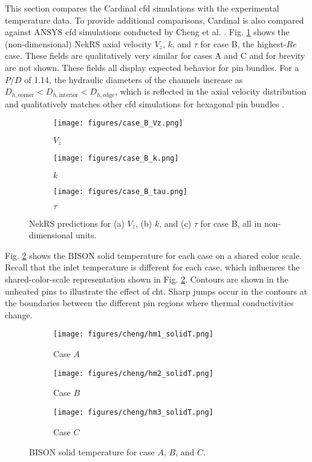 \documentclass[3p,,preprint,11pt]{elsarticle}
\begin{document}
This section compares the Cardinal \gls{cfd} simulations with the experimental temperature data. To provide additional comparisons, Cardinal is also compared against ANSYS \gls{cfd} simulations conducted by Cheng et al. \cite{cheng2009}. Fig. \ref{fig:velocity} shows the (non-dimensional) NekRS axial velocity $V_z$, $k$, and $\tau$ for case B, the highest-$Re$ case. These fields are qualitatively very similar for cases A and C and for brevity are not shown. These fields all display expected behavior for pin bundles. For a $P/D$ of 1.14, the hydraulic diameters of the channels increase as $D_{h,\text{corner}}<D_{h,\text{interior}}<D_{h,\text{edge}}$, which is reflected in the axial velocity distribution and qualitatively matches other \gls{cfd} simulations for hexagonal pin bundles \cite{chang_2017}. %

\begin{figure}[!htb]
\centering
\begin{subfigure}{0.315\textwidth}
  \centering
  \texttt{[image: figures/case\_B\_Vz.png]}
  \caption{$V_z$}
\end{subfigure}
\begin{subfigure}{0.315\textwidth}
  \centering
  \texttt{[image: figures/case\_B\_k.png]}
  \caption{$k$}
\end{subfigure}
\begin{subfigure}{0.315\textwidth}
  \centering
  \texttt{[image: figures/case\_B\_tau.png]}
  \caption{$\tau$}
\end{subfigure}
\caption{NekRS predictions for (a) $V_z$, (b) $k$, and (c) $\tau$ for case B, all in non-dimensional units.}
\label{fig:velocity}
\end{figure}

Fig. \ref{fig:solid_t} shows the BISON solid temperature for each case on a shared color scale. Recall that the inlet temperature is different for each case, which influences the shared-color-scale representation shown in Fig. \ref{fig:solid_t}. Contours are shown in the unheated pins to illustrate the effect of \gls{cht}. Sharp jumps occur in the contours at the boundaries between the different pin regions where thermal conductivities change. 

\begin{figure}[!htb]
\centering
\begin{subfigure}{0.315\textwidth}
  \centering
  \texttt{[image: figures/cheng/hm1\_solidT.png]}
  \caption{Case $A$}
\end{subfigure}
\begin{subfigure}{0.315\textwidth}
  \centering
  \texttt{[image: figures/cheng/hm2\_solidT.png]}
  \caption{Case $B$}
\end{subfigure}
\begin{subfigure}{0.315\textwidth}
  \centering
  \texttt{[image: figures/cheng/hm3\_solidT.png]}
  \caption{Case $C$}
\end{subfigure}
\caption{BISON solid temperature for case $A$, $B$, and $C$.}
\label{fig:solid_t}
\end{figure}
\end{document}
